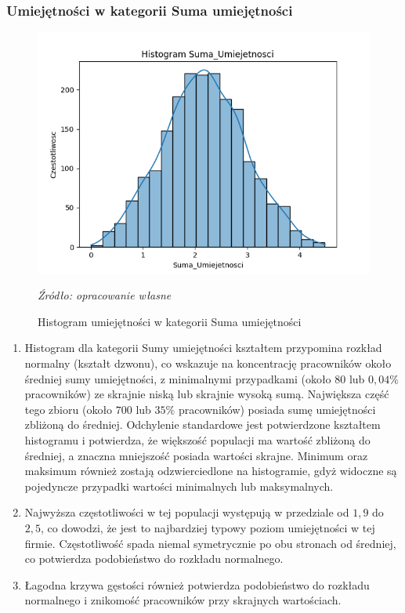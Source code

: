         \subsubsection{Umiejętności w kategorii Suma umiejętności}
        \begin{figure}[H]
            \centering
            \includegraphics[width=\linewidth]{chapters/Images/hist_suma.png}
            \cprotect\caption{Histogram umiejętności w kategorii Suma umiejętności}
            \textit{Źródło: opracowanie własne} 
            \label{fig:hist_suma}
        \end{figure}

        \begin{enumerate}
            \item Histogram dla kategorii Sumy umiejętności kształtem przypomina rozkład normalny (kształt dzwonu), co wskazuje na koncentrację pracowników około średniej sumy umiejętności, z minimalnymi przypadkami (około $80$ lub $0,04\%$ pracowników) ze skrajnie niską lub skrajnie wysoką sumą. Największa część tego zbioru (około $700$ lub $35\%$ pracowników) posiada sumę umiejętności zbliżoną do średniej. Odchylenie standardowe jest potwierdzone kształtem histogramu i potwierdza, że większość populacji ma wartość zbliżoną do średniej, a znaczna mniejszość posiada wartości skrajne. Minimum oraz maksimum również zostają odzwierciedlone na histogramie, gdyż widoczne są pojedyncze przypadki wartości minimalnych lub maksymalnych.
            \item Najwyższa częstotliwości w tej populacji występują w przedziale od $1,9$ do $2,5$, co dowodzi, że jest to najbardziej typowy poziom umiejętności w tej firmie. Częstotliwość spada niemal symetrycznie po obu stronach od średniej, co potwierdza podobieństwo do rozkładu normalnego.
            \item Łagodna krzywa gęstości również potwierdza podobieństwo do rozkładu normalnego i znikomość pracowników przy skrajnych wartościach. 
        \end{enumerate}

